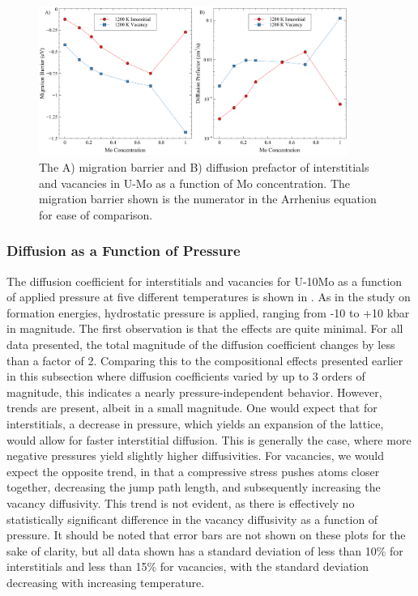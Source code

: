 \documentclass[review]{elsarticle}
\providecommand{\DIFdel}[1]{{[..\footnote{removed: #1} ]}} %
\providecommand{\DIFdelbegin}{\protect\color{red}} %
\providecommand{\DIFdelend}{\protect\color{black}} %
\newcommand{\DIFscaledelfig}{0.5}
\newlength{\DIFdelgraphicswidth} %
\newlength{\DIFdelgraphicsheight} %
\newcommand{\DIFdelincludegraphics}[2][]{%
\sbox{\DIFdelgraphicsbox}{\DIFOincludegraphics[#1]{#2}}%
\settoboxwidth{\DIFdelgraphicswidth}{\DIFdelgraphicsbox} %
\settoboxtotalheight{\DIFdelgraphicsheight}{\DIFdelgraphicsbox} %
\scalebox{\DIFscaledelfig}{%
\parbox[b]{\DIFdelgraphicswidth}{\usebox{\DIFdelgraphicsbox}\\[-\baselineskip] \rule{\DIFdelgraphicswidth}{0em}}\llap{\resizebox{\DIFdelgraphicswidth}{\DIFdelgraphicsheight}{%
\setlength{\unitlength}{\DIFdelgraphicswidth}%
\begin{picture}(1,1)%
\thicklines\linethickness{2pt} %
{\color[rgb]{1,0,0}\put(0,0){\framebox(1,1){}}}%
{\color[rgb]{1,0,0}\put(0,0){\line( 1,1){1}}}%
{\color[rgb]{1,0,0}\put(0,1){\line(1,-1){1}}}%
\end{picture}%
}\hspace*{3pt}}} %
} %
\DeclareRobustCommand{\DIFdelbegin}{\DIFOdelbegin \let\includegraphics\DIFdelincludegraphics} %
\DeclareRobustCommand{\DIFdelend}{\DIFOaddend \let\includegraphics\DIFOincludegraphics} %
\begin{document}
\begin{figure}[h!]
    \centering
    \includegraphics[width=0.9\textwidth]{Em_D0.pdf}
    \caption{The A) migration barrier and B) diffusion prefactor of interstitials and vacancies in U-Mo as a function of Mo concentration. The migration barrier shown is the numerator in the Arrhenius equation for ease of comparison.}
    \label{fig:Em_D0}
\end{figure}

\FloatBarrier

\subsubsection{Diffusion as a Function of Pressure}

The diffusion coefficient for interstitials and vacancies for U-10Mo as a function of applied pressure at five different temperatures is shown in . As in the study on formation energies, hydrostatic pressure is applied, ranging from -10 to +10 kbar \DIFdelbegin \DIFdel{(-1 GPa to +1 GPa) }\DIFdelend in magnitude. The first observation is that the effects are quite minimal. For all data presented, the total magnitude of the diffusion coefficient changes by less than a factor of 2. Comparing this to the compositional effects presented earlier in this subsection where diffusion coefficients varied by up to 3 orders of magnitude, this indicates a nearly pressure-independent behavior. However, trends are present, albeit in a small magnitude. One would expect that for interstitials, a decrease in pressure, which yields an expansion of the lattice, would allow for faster interstitial diffusion. This is generally the case, where more negative pressures yield slightly higher diffusivities. For vacancies, we would expect the opposite trend, in that a compressive stress pushes atoms closer together, decreasing the jump path length, and subsequently increasing the vacancy diffusivity. This trend is not evident, as there is effectively no statistically significant difference in the vacancy diffusivity as a function of pressure. It should be noted that error bars are not shown on these plots for the sake of clarity, but all data shown has a standard deviation of less than 10\% for interstitials and less than 15\% for vacancies, with the standard deviation decreasing with increasing temperature. 
\end{document}
